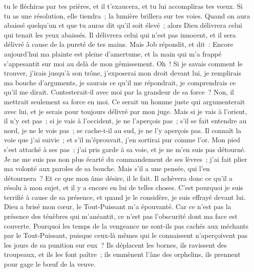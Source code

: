 \begin{multicols}{2}
tu le fléchiras par tes prières, et il t'exaucera, et tu lui accompliras tes vœux.
Si tu as une résolution, elle tiendra~; la lumière brillera sur tes voies.
Quand on aura abaissé quelqu'un et que tu auras dit qu'il soit élevé~; alors Dieu délivrera celui qui tenait les yeux abaissés.
Il délivrera celui qui n'est pas innocent, et il sera délivré à cause de la pureté de tes mains.
\VerseOne{}Mais Job répondit, et dit~:
Encore aujourd'hui ma plainte est pleine d'amertume, et la main qui m'a frappé s'appesantit sur moi au delà de mon gémissement.
Oh~! Si je savais comment le trouver, j'irais jusqu'à son trône,
j'exposerai mon droit devant lui, je remplirais ma bouche d'arguments,
je saurais ce qu'il me répondrait, je comprendrais ce qu'il me dirait.
Contesterait-il avec moi par la grandeur de sa force~? Non, il mettrait seulement sa force en moi. 
Ce serait un homme juste qui argumenterait avec lui, et je serais pour toujours délivré par mon juge.
Mais si je vais à l'orient, il n'y est pas~; si je vais à l'occident, je ne l'aperçois pas~;
s'il se fait entendre au nord, je ne le vois pas~; se cache-t-il au sud, je ne l'y aperçois pas.
Il connaît la voie que j'ai suivie~; et s'il m'éprouvait, j'en sortirai pur comme l'or.
Mon pied s'est attaché à ses pas~; j'ai pris garde à sa voie, et je ne m'en suis pas détourné.
Je ne me suis pas non plus écarté du commandement de ses lèvres~; j'ai fait plier ma volonté aux paroles de sa bouche.
Mais s'il a une pensée, qui l'en détournera~? Et ce que mon âme désire, il le fait.
Il achèvera donc ce qu'il a résolu à mon sujet, et il y a encore en lui de telles choses.
C'est pourquoi je suis terrifié à cause de sa présence, et quand je le considère, je suis effrayé devant lui.
Dieu a brisé mon cœur, le Tout-Puissant m'a épouvanté.
Car ce n'est pas la présence des ténèbres qui m'anéantit, ce n'est pas l'obscurité dont ma face est couverte.
\VerseOne{}Pourquoi les temps de la vengeance ne sont-ils pas cachés aux méchants par le Tout-Puissant, puisque ceux-là mêmes qui le connaissent n'aperçoivent pas les jours de sa punition sur eux~?
Ils déplacent les bornes, ils ravissent des troupeaux, et ils les font paître~;
ils emmènent l'âne des orphelins, ils prennent pour gage le bœuf de la veuve.

\end{multicols}
